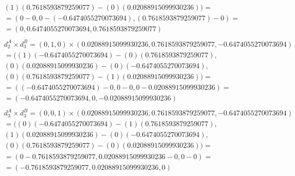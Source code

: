 \documentclass[a4paper]{article}
\begin{document}
\begin{align*}
		\\
		&(1) (0.7618593879259077) - (0) (0.02088915099930236)) =
		\\
		&=(0-0, 0-(-0.6474055270073694), (0.7618593879259077)-0)=
		\\
		&=(0, 0.6474055270073694, 0.7618593879259077)
		\\
		\\
		&d_2^A \times d_3^B = (0, 1, 0) \times (0.02088915099930236, 0.7618593879259077, -0.6474055270073694)
		\\
		&= ((1) (-0.6474055270073694) - (0) (0.7618593879259077), 
		\\
		&(0) (0.02088915099930236) - (0) (-0.6474055270073694), 
		\\
		&(0) (0.7618593879259077) - (1) (0.02088915099930236)) =
		\\
		&=((-0.6474055270073694)-0, 0-0, 0-0.02088915099930236)=
		\\
		&=(-0.6474055270073694, 0, -0.02088915099930236)
		\\
		\\
		&d_3^A \times d_3^B = (0, 0, 1) \times (0.02088915099930236, 0.7618593879259077, -0.6474055270073694)
		\\
		&= ((0) (-0.6474055270073694) - (1) (0.7618593879259077), 
		\\
		&(1) (0.02088915099930236) - (0) (-0.6474055270073694), 
		\\
		&(0) (0.7618593879259077) - (0) (0.02088915099930236)) =
		\\
		&=(0-0.7618593879259077, 0.02088915099930236-0, 0-0)=
		\\
		&=(-0.7618593879259077, 0.02088915099930236, 0)
	\end{align*}
	\newpage
\end{document}
